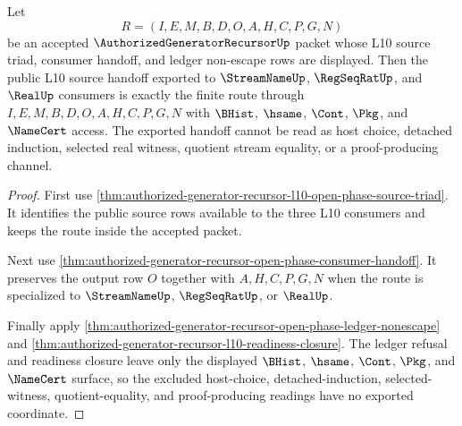 \begin{theorem}
\label{thm:authorized-generator-recursor-l10-public-source-handoff}
Let
$$
R=(I,E,M,B,D,O,A,H,C,P,G,N)
$$
be an accepted $\AuthorizedGeneratorRecursorUp$ packet whose L10 source triad, consumer handoff, and ledger non-escape rows are displayed. Then the public L10 source handoff exported to $\StreamNameUp$, $\RegSeqRatUp$, and $\RealUp$ consumers is exactly the finite route through $I,E,M,B,D,O,A,H,C,P,G,N$ with $\BHist$, $\hsame$, $\Cont$, $\Pkg$, and $\NameCert$ access. The exported handoff cannot be read as host choice, detached induction, selected real witness, quotient stream equality, or a proof-producing channel.
\end{theorem}
\begin{proof}
First use \autoref{thm:authorized-generator-recursor-l10-open-phase-source-triad}. It identifies the public source rows available to the three L10 consumers and keeps the route inside the accepted packet.

Next use \autoref{thm:authorized-generator-recursor-open-phase-consumer-handoff}. It preserves the output row $O$ together with $A,H,C,P,G,N$ when the route is specialized to $\StreamNameUp$, $\RegSeqRatUp$, or $\RealUp$.

Finally apply \autoref{thm:authorized-generator-recursor-open-phase-ledger-nonescape} and \autoref{thm:authorized-generator-recursor-l10-readiness-closure}. The ledger refusal and readiness closure leave only the displayed $\BHist$, $\hsame$, $\Cont$, $\Pkg$, and $\NameCert$ surface, so the excluded host-choice, detached-induction, selected-witness, quotient-equality, and proof-producing readings have no exported coordinate.
\end{proof}

